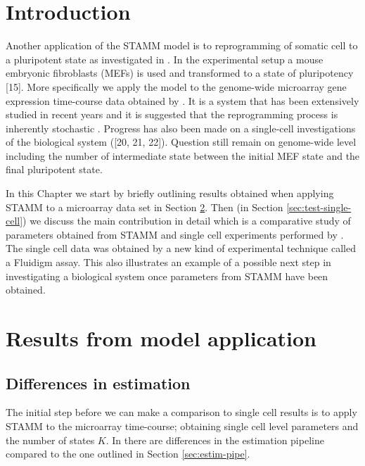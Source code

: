 \section{Introduction}
\label{sec:introduction-rep}

Another application of the STAMM model is to reprogramming of somatic cell to a pluripotent state as investigated in \cite{Armond:2013}. In the experimental setup a mouse embryonic fibroblasts (MEFs) is used and transformed to a state of pluripotency \citep{Takahashi:2006hi,Jaenisch:2008cz} {\color{red} [15]}. More specifically we apply the model to the genome-wide microarray gene expression time-course data obtained by \cite{SamavarchiTehrani:2010cp}. It is a system that has been extensively studied in recent years and it is suggested that the reprogramming process is inherently stochastic \citep{Hanna:2009ix}. Progress has also been made on a single-cell investigations of the biological system \citep{Buganim:2012hp} {\color{red} ([20, 21, 22])}. Question still remain on genome-wide level including the number of intermediate state between the initial MEF state and the final pluripotent state. 

In this Chapter we start by briefly outlining results obtained \cite{Armond:2013} when applying STAMM to a microarray data set in Section \ref{sec:iPsc-results}. Then (in Section \ref{sec:test-single-cell}) we discuss the main contribution in detail which is a comparative study of parameters obtained from STAMM and single cell experiments performed by \cite{Buganim:2012hp}. The single cell data was obtained by a new kind of experimental technique called a Fluidigm assay. This also illustrates an example of a possible next step in investigating a biological system once parameters from STAMM have been obtained. 

\section{Results from model application}
\label{sec:iPsc-results}

\subsection{Differences in estimation}
\label{sec:diff-estim}

The initial step before we can make a comparison to single cell results is to apply STAMM to the microarray time-course; obtaining single cell level parameters and the number of states $K$. In  \cite{Armond:2013} there are differences in the estimation pipeline compared to the one outlined in Section \ref{sec:estim-pipe}.

